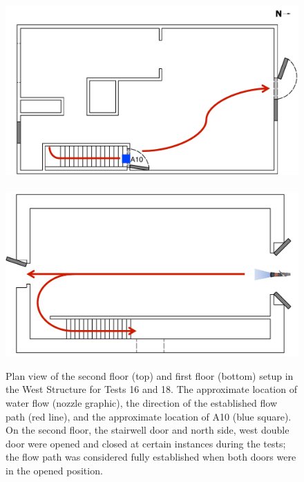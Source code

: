 \documentclass[12pt,oneside]{book}
\begin{document}
\begin{figure}[!ht]
	\includegraphics[width=\columnwidth]{../Figures/Floor_Plans/Specific_Tests/West_Hose_Test_2nd_Floor_Annotated}
	\\~\\
	\includegraphics[width=\columnwidth]{../Figures/Floor_Plans/Specific_Tests/West_Hose_Test_18_1st_Floor_Annotated}
	\caption[Plan view of the West Structure setup for Tests 16 and 18.]{Plan view of the second floor (top) and first floor (bottom) setup in the West Structure for Tests 16 and 18. The approximate location of water flow (nozzle graphic), the direction of the established flow path (red line), and the approximate location of A10 (blue square). On the second floor, the stairwell door and north side, west double door were opened and closed at certain instances during the tests; the flow path was considered fully established when both doors were in the opened position.}
	\label{fig:flow_path_1}
\end{figure}
\end{document}
